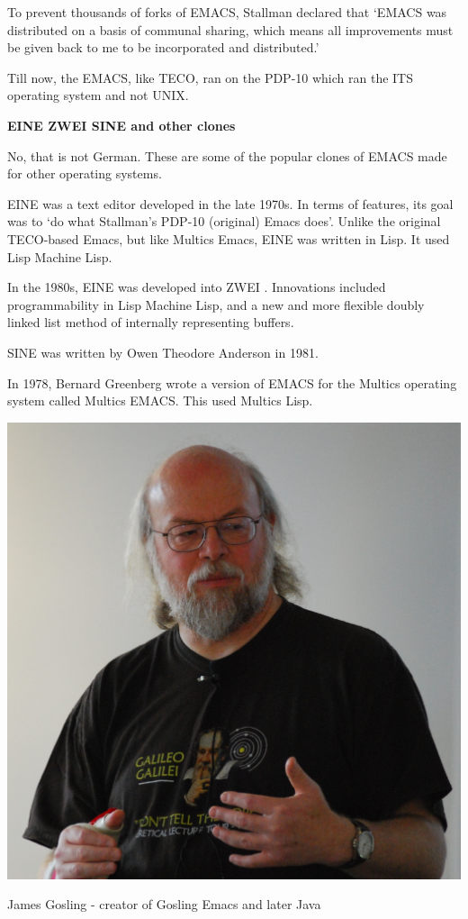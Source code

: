 To prevent thousands of forks of EMACS, Stallman
declared that
`EMACS was distributed on a basis of communal sharing,
which means all improvements must be given back to me
to be incorporated and distributed.'

Till now, the EMACS, like TECO, ran on the PDP-10
which ran the ITS operating system and not UNIX.

\textbf{EINE ZWEI SINE and other clones}

No, that is not German.
These are some of the popular clones of EMACS
made for other operating systems.

EINE
was a text editor developed in the late 1970s.
In terms of features, its goal was to `do what Stallman's
PDP-10 (original) Emacs does'.
Unlike the original TECO-based Emacs, but like Multics Emacs,
EINE was written in Lisp. It used Lisp Machine Lisp.

In the 1980s, EINE was developed into ZWEI
.
Innovations included programmability in Lisp Machine Lisp,
and a new and more flexible doubly linked
list method of internally representing buffers.


SINE
was written by Owen Theodore Anderson in 1981.

In 1978, Bernard Greenberg wrote a version of EMACS
for the Multics operating system called Multics EMACS.
This used Multics Lisp.


\begin{marginfigure}
  \includegraphics{images/png/gosling.png}
  \caption{James Gosling - creator of Gosling Emacs and later Java}
\end{marginfigure}

